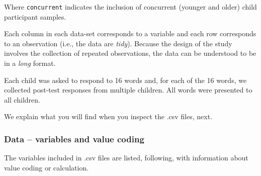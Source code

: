 \documentclass[
  letterpaper,
  DIV=11,
  numbers=noendperiod]{scrreprt}
\begin{document}
Where \texttt{concurrent} indicates the inclusion of concurrent (younger
and older) child participant samples.

Each column in each data-set corresponds to a variable and each row
corresponds to an observation (i.e., the data are \emph{tidy}). Because
the design of the study involves the collection of repeated
observations, the data can be understood to be in a \emph{long} format.

Each child was asked to respond to 16 words and, for each of the 16
words, we collected post-test responses from multiple children. All
words were presented to all children.

We explain what you will find when you inspect the .csv files, next.

\hypertarget{sec-ricketts-variables}{%
\subsubsection{Data -- variables and value
coding}\label{sec-ricketts-variables}}

The variables included in .csv files are listed, following, with
information about value coding or calculation.
\end{document}
